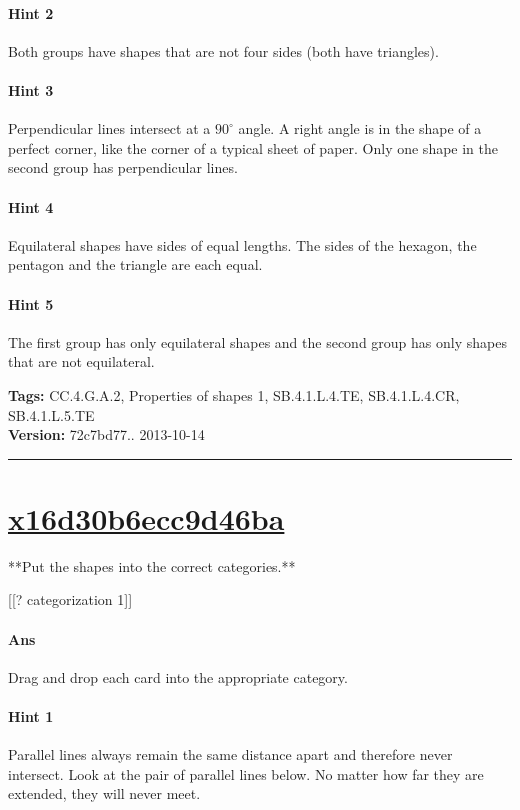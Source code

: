 \documentclass[twocolumn,10pt]{article}
\begin{document}
\paragraph{Hint 2}Both groups have shapes that are not four sides (both have triangles).

\paragraph{Hint 3}Perpendicular lines intersect at a $90 ^\circ$ angle.
A right angle is in the shape of a perfect corner, like the corner of a typical sheet of paper.  Only one shape in the second group has perpendicular lines.

\paragraph{Hint 4}Equilateral shapes have sides of equal lengths.  The sides of the hexagon, the pentagon and the triangle are each equal.

\paragraph{Hint 5}The first group has only equilateral shapes and the second group has only shapes that are not equilateral.



\medskip
\noindent
\textbf{Tags:} {\footnotesize CC.4.G.A.2, Properties of shapes 1, SB.4.1.L.4.TE, SB.4.1.L.4.CR, SB.4.1.L.5.TE}\\
\textbf{Version:} 72c7bd77.. 2013-10-14
\smallskip\hrule





\section{\href{https://www.khanacademy.org/devadmin/content/items/x16d30b6ecc9d46ba}{x16d30b6ecc9d46ba}}

\noindent
**Put the shapes into the correct categories.**

[[? categorization 1]]


\paragraph{Ans} Drag and drop each card into the appropriate category. 

\paragraph{Hint 1}Parallel lines always remain the same distance apart and therefore never intersect.  Look at the pair of parallel lines below.  No matter how far they are extended, they will never meet.
\end{document}

